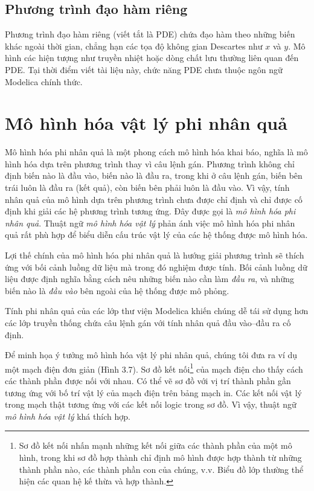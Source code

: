 \subsection{Phương trình đạo hàm riêng}
Phương trình đạo hàm riêng (viết tắt là PDE) chứa đạo hàm theo những biến khác ngoài thời gian, chẳng hạn các tọa độ không gian Descartes như $x$ và $y$. Mô hình các hiện tượng như truyền nhiệt hoặc dòng chất lưu thường liên quan đến PDE. Tại thời điểm viết tài liệu này, chức năng PDE chưa thuộc ngôn ngữ Modelica chính thức.

\section{Mô hình hóa vật lý phi nhân quả}
Mô hình hóa phi nhân quả là một phong cách mô hình hóa khai báo, nghĩa là mô hình hóa dựa trên phương trình thay vì câu lệnh gán. Phương trình không chỉ định biến nào là đầu vào, biến nào là đầu ra, trong khi ở câu lệnh gán, biến bên trái luôn là đầu ra (kết quả), còn biến bên phải luôn là đầu vào. Vì vậy, tính nhân quả của mô hình dựa trên phương trình chưa được chỉ định và chỉ được cố định khi giải các hệ phương trình tương ứng. Đây được gọi là \emph{mô hình hóa phi nhân quả}. Thuật ngữ \emph{mô hình hóa vật lý} phản ánh việc mô hình hóa phi nhân quả rất phù hợp để biểu diễn cấu trúc vật lý của các hệ thống được mô hình hóa.

Lợi thế chính của mô hình hóa phi nhân quả là hướng giải phương trình sẽ thích ứng với bối cảnh luồng dữ liệu mà trong đó nghiệm được tính. Bối cảnh luồng dữ liệu được định nghĩa bằng cách nêu những biến nào cần làm \emph{đầu ra}, và những biến nào là \emph{đầu vào} bên ngoài của hệ thống được mô phỏng.

Tính phi nhân quả của các lớp thư viện Modelica khiến chúng dễ tái sử dụng hơn các lớp truyền thống chứa câu lệnh gán với tính nhân quả đầu vào--đầu ra cố định.

Để minh họa ý tưởng mô hình hóa vật lý phi nhân quả, chúng tôi đưa ra ví dụ một mạch điện đơn giản (Hình 3.7). Sơ đồ kết nối\footnote{Sơ đồ kết nối nhấn mạnh những kết nối giữa các thành phần của một mô hình, trong khi sơ đồ hợp thành chỉ định mô hình được hợp thành từ những thành phần nào, các thành phần con của chúng, v.v. Biểu đồ lớp thường thể hiện các quan hệ kế thừa và hợp thành.} của mạch điện cho thấy cách các thành phần được nối với nhau. Có thể vẽ sơ đồ với vị trí thành phần gần tương ứng với bố trí vật lý của mạch điện trên bảng mạch in. Các kết nối vật lý trong mạch thật tương ứng với các kết nối logic trong sơ đồ. Vì vậy, thuật ngữ \emph{mô hình hóa vật lý} khá thích hợp.

